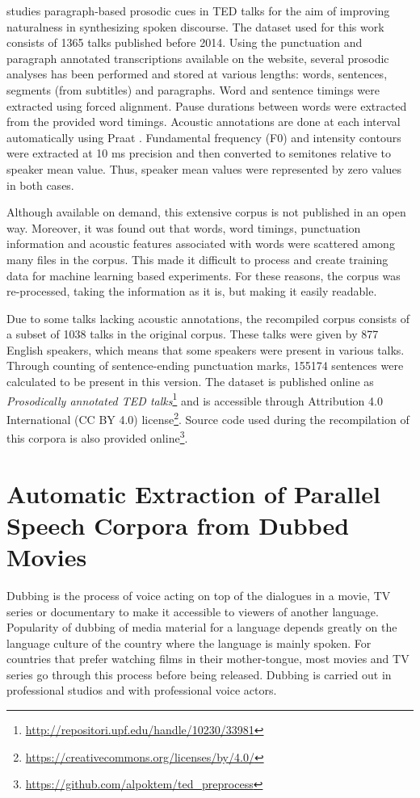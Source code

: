 \cite{Farrus:SP:2016} studies paragraph-based prosodic cues in TED talks for the aim of improving naturalness in synthesizing spoken discourse. The dataset used for this work consists of 1365 talks published before 2014. Using the punctuation and paragraph annotated transcriptions available on the website, several prosodic analyses has been performed and stored at various lengths: words, sentences, segments (from subtitles) and paragraphs. Word and sentence timings were extracted using forced alignment. Pause durations between words were extracted from the provided word timings. Acoustic annotations are done at each interval automatically using Praat \citep{boersma01}. Fundamental frequency (F0) and intensity contours were extracted at 10 ms precision and then converted to semitones relative to speaker mean value. Thus, speaker mean values were represented by zero values in both cases. 

Although available on demand, this extensive corpus is not published in an open way. Moreover, it was found out that words, word timings, punctuation information and acoustic features associated with words were scattered among many files in the corpus. This made it difficult to process and create training data for machine learning based experiments. For these reasons, the corpus was re-processed, taking the information as it is, but making it easily readable. 

Due to some talks lacking acoustic annotations, the recompiled corpus consists of a subset of 1038 talks in the original corpus. These talks were given by 877 English speakers, which means that some speakers were present in various talks. Through counting of sentence-ending punctuation marks, 155174 sentences were calculated to be present in this version. The dataset is published online as \textit{Prosodically annotated TED talks}\footnote{\url{http://repositori.upf.edu/handle/10230/33981}} and is accessible through Attribution 4.0 International (CC BY 4.0) license\footnote{\url{https://creativecommons.org/licenses/by/4.0/}}. Source code used during the recompilation of this corpora is also provided online\footnote{\url{https://github.com/alpoktem/ted_preprocess}}.

\section{Automatic Extraction of Parallel Speech Corpora from Dubbed Movies}
\label{corpusWorks:movie2parallelDB}
Dubbing is the process of voice acting on top of the dialogues in a movie, TV series or documentary to make it accessible to viewers of another language. Popularity of dubbing of media material for a language depends greatly on the language culture of the country where the language is mainly spoken. For countries that prefer watching films in their mother-tongue, most movies and TV series go through this process before being released. Dubbing is carried out in professional studios and with professional voice actors. 

